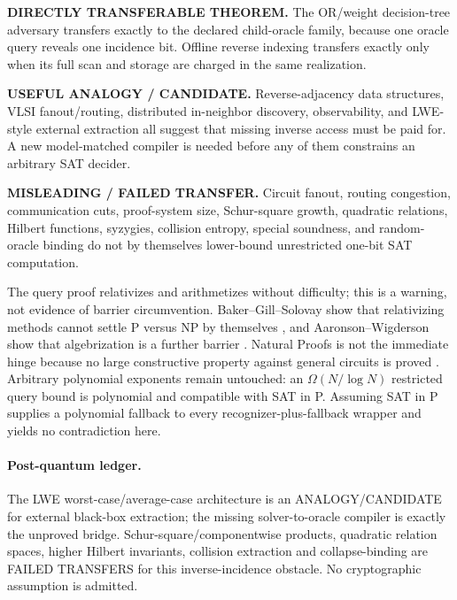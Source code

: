 \documentclass[11pt]{article}
\begin{document}
\begin{description}[leftmargin=0cm,labelwidth=0cm]
\item[] \textbf{DIRECTLY TRANSFERABLE THEOREM.}
The OR/weight decision-tree adversary transfers exactly to the declared
child-oracle family, because one oracle query reveals one incidence bit.
Offline reverse indexing transfers exactly only when its full scan and
storage are charged in the same realization.
\item[] \textbf{USEFUL ANALOGY / CANDIDATE.}
Reverse-adjacency data structures, VLSI fanout/routing, distributed in-neighbor
discovery, observability, and LWE-style external extraction all suggest that
missing inverse access must be paid for.  A new model-matched compiler is
needed before any of them constrains an arbitrary SAT decider.
\item[] \textbf{MISLEADING / FAILED TRANSFER.}
Circuit fanout, routing congestion, communication cuts, proof-system size,
Schur-square growth, quadratic relations, Hilbert functions, syzygies,
collision entropy, special soundness, and random-oracle binding do not by
themselves lower-bound unrestricted one-bit SAT computation.
\end{description}

The query proof relativizes and arithmetizes without difficulty; this is a
warning, not evidence of barrier circumvention.  Baker--Gill--Solovay show
that relativizing methods cannot settle P versus NP by themselves
\cite{bgs}, and Aaronson--Wigderson show that algebrization is a further
barrier \cite{aw}.  Natural Proofs is not the immediate hinge because no
large constructive property against general circuits is proved
\cite{rr}.  Arbitrary polynomial exponents remain untouched: an
$\Omega(N/\log N)$ restricted query bound is polynomial and compatible with
SAT in P.  Assuming SAT in P supplies a polynomial fallback to every
recognizer-plus-fallback wrapper and yields no contradiction here.

\paragraph{Post-quantum ledger.}
The LWE worst-case/average-case architecture is an ANALOGY/CANDIDATE for
external black-box extraction; the missing solver-to-oracle compiler is
exactly the unproved bridge.  Schur-square/componentwise products, quadratic
relation spaces, higher Hilbert invariants, collision extraction and
collapse-binding are FAILED TRANSFERS for this inverse-incidence obstacle.
No cryptographic assumption is admitted.
\end{document}

